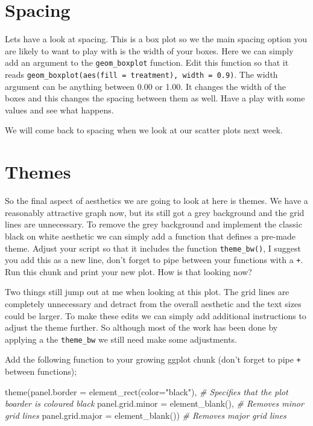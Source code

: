 \documentclass[
]{book}
\newenvironment{Shaded}{\begin{snugshade}}{\end{snugshade}}
\newcommand{\AttributeTok}[1]{\textcolor[rgb]{0.77,0.63,0.00}{#1}}
\newcommand{\CommentTok}[1]{\textcolor[rgb]{0.56,0.35,0.01}{\textit{#1}}}
\newcommand{\FunctionTok}[1]{\textcolor[rgb]{0.00,0.00,0.00}{#1}}
\newcommand{\NormalTok}[1]{#1}
\newcommand{\StringTok}[1]{\textcolor[rgb]{0.31,0.60,0.02}{#1}}
\begin{document}
\hypertarget{spacing}{%
\section{Spacing}\label{spacing}}

Lets have a look at spacing. This is a box plot so we the main spacing option you are likely to want to play with is the width of your boxes. Here we can simply add an argument to the \texttt{geom\_boxplot} function. Edit this function so that it reads \texttt{geom\_boxplot(aes(fill\ =\ treatment),\ width\ =\ 0.9)}. The width argument can be anything between 0.00 or 1.00. It changes the width of the boxes and this changes the spacing between them as well. Have a play with some values and see what happens.

We will come back to spacing when we look at our scatter plots next week.

\hypertarget{themes}{%
\section{Themes}\label{themes}}

So the final aspect of aesthetics we are going to look at here is themes. We have a reasonably attractive graph now, but its still got a grey background and the grid lines are unnecessary. To remove the grey background and implement the classic black on white aesthetic we can simply add a function that defines a pre-made theme. Adjust your script so that it includes the function \texttt{theme\_bw()}, I suggest you add this as a new line, don't forget to pipe between your functions with a \texttt{+}. Run this chunk and print your new plot. How is that looking now?

Two things still jump out at me when looking at this plot. The grid lines are completely unnecessary and detract from the overall aesthetic and the text sizes could be larger. To make these edits we can simply add additional instructions to adjust the theme further. So although most of the work has been done by applying a the \texttt{theme\_bw} we still need make some adjustments.

Add the following function to your growing ggplot chunk (don't forget to pipe \texttt{+} between functions);

\begin{Shaded}
\begin{Highlighting}[]
\FunctionTok{theme}\NormalTok{(}\AttributeTok{panel.border =} \FunctionTok{element\_rect}\NormalTok{(}\AttributeTok{color=}\StringTok{"black"}\NormalTok{), }\CommentTok{\# Specifies that the plot boarder is coloured black}
        \AttributeTok{panel.grid.minor =} \FunctionTok{element\_blank}\NormalTok{(), }\CommentTok{\# Removes minor grid lines }
        \AttributeTok{panel.grid.major =} \FunctionTok{element\_blank}\NormalTok{()) }\CommentTok{\# Removes major grid lines }
\end{Highlighting}
\end{Shaded}
\end{document}
